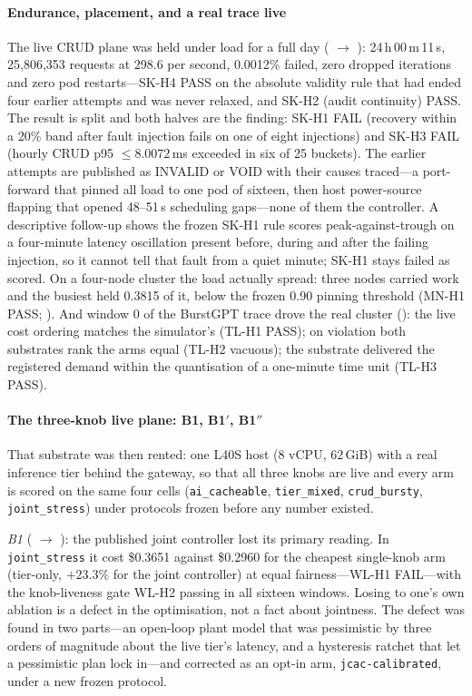 \paragraph{Endurance, placement, and a real trace live} The live CRUD
plane was held under load for a full day (
$\to$ ): 24\,h\,00\,m\,11\,s, 25,806,353
requests at 298.6 per second, 0.0012\% failed, zero dropped iterations and
zero pod restarts---SK-H4 PASS on the absolute validity rule that had ended
four earlier attempts and was never relaxed, and SK-H2 (audit continuity)
PASS. The result is split and both halves are the finding: SK-H1 FAIL
(recovery within a 20\% band after fault injection fails on one of eight
injections) and SK-H3 FAIL (hourly CRUD p95 $\le 8.0072$\,ms exceeded in
six of 25 buckets). The earlier attempts are published as INVALID or VOID
with their causes traced---a port-forward that pinned all load to one pod
of sixteen, then host power-source flapping that opened 48--51\,s
scheduling gaps---none of them the controller. A descriptive follow-up
shows the frozen SK-H1 rule scores peak-against-trough on a four-minute
latency oscillation present before, during and after the failing
injection, so it cannot tell that fault from a quiet minute; SK-H1 stays
failed as scored. On a four-node cluster the load actually spread: three
nodes carried work and the busiest held 0.3815 of it, below the frozen
0.90 pinning threshold (MN-H1 PASS; ). And
window 0 of the BurstGPT trace drove the real cluster
(): the live cost ordering matches the
simulator's (TL-H1 PASS); on violation both substrates rank the arms equal
(TL-H2 vacuous); the substrate delivered the registered demand within the
quantisation of a one-minute time unit (TL-H3 PASS).

\paragraph{The three-knob live plane: B1, B1$'$, B1$''$} That substrate
was then rented: one L40S host (8 vCPU, 62\,GiB) with a real inference tier
behind the gateway, so that all three knobs are live and every arm is
scored on the same four cells (\texttt{ai\_cacheable}, \texttt{tier\_mixed},
\texttt{crud\_bursty}, \texttt{joint\_stress}) under protocols frozen before
any number existed.

\emph{B1} ( $\to$
): the published joint controller
lost its primary reading. In \texttt{joint\_stress} it cost \$0.3651 against
\$0.2960 for the cheapest single-knob arm (tier-only, $+23.3\%$ for the
joint controller) at equal fairness---WL-H1 FAIL---with the knob-liveness
gate WL-H2 passing in all sixteen windows. Losing to one's own ablation is
a defect in the optimisation, not a fact about jointness. The defect was
found in two parts---an open-loop plant model that was pessimistic by three
orders of magnitude about the live tier's latency, and a hysteresis ratchet
that let a pessimistic plan lock in---and corrected as an opt-in arm,
\texttt{jcac-calibrated}, under a new frozen protocol.

